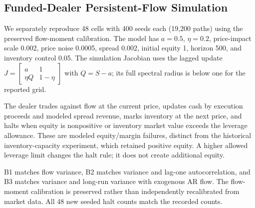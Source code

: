 \documentclass[12pt]{article}
\theoremstyle{definition}
\theoremstyle{remark}
\begin{document}
\subsection{Funded-Dealer Persistent-Flow Simulation}
We separately reproduce 48 cells with 400 seeds each (19,200 paths) using the preserved flow-moment calibration. The model has $a=0.5$, $\eta=0.2$, price-impact scale 0.002, price noise 0.0005, spread 0.002, initial equity 1, horizon 500, and inventory control 0.05. The simulation Jacobian uses the lagged update $J=\left[\begin{smallmatrix}a&1\\\eta Q&1-\eta\end{smallmatrix}\right]$ with $Q=S-a$; its full spectral radius is below one for the reported grid.

The dealer trades against flow at the current price, updates cash by execution proceeds and modeled spread revenue, marks inventory at the next price, and halts when equity is nonpositive or inventory market value exceeds the leverage allowance. These are modeled equity/margin failures, distinct from the historical inventory-capacity experiment, which retained positive equity. A higher allowed leverage limit changes the halt rule; it does not create additional equity.

B1 matches flow variance, B2 matches variance and lag-one autocorrelation, and B3 matches variance and long-run variance with exogenous AR flow. The flow-moment calibration is preserved rather than independently recalibrated from market data. All 48 new seeded halt counts match the recorded counts.
\end{document}
